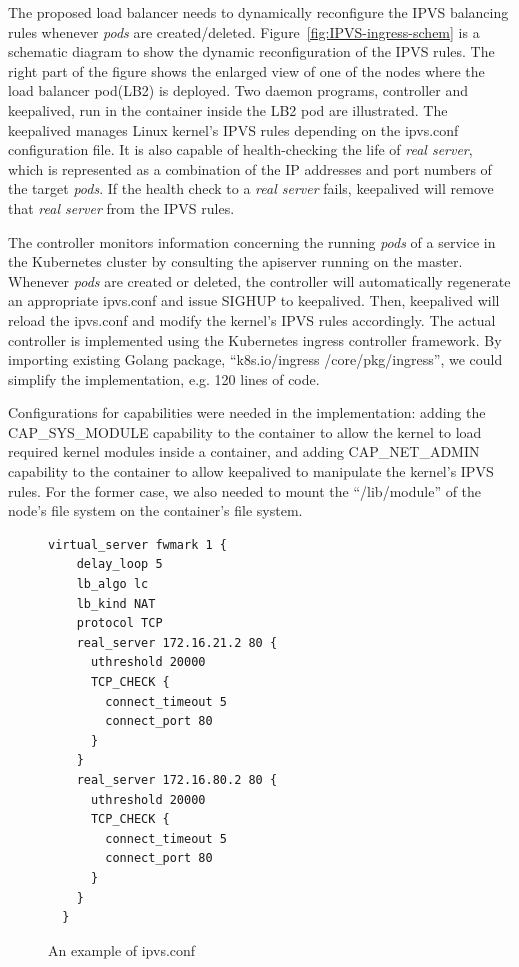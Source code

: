 The proposed load balancer needs to dynamically reconfigure the IPVS balancing rules whenever {\em pods} are created/deleted. 
Figure~\ref{fig:IPVS-ingress-schem} is a schematic diagram to show the dynamic reconfiguration of the IPVS rules.
The right part of the figure shows the enlarged view of one of the nodes where the load balancer pod(LB2) is deployed.
Two daemon programs, controller and keepalived, run in the container inside the LB2 pod are illustrated.
The keepalived manages Linux kernel's IPVS rules depending on the ipvs.conf configuration file.
It is also capable of health-checking the life of {\em real server}, 
which is represented as a combination of the IP addresses and port numbers of the target {\em pods}. 
If the health check to a {\em real server} fails, keepalived will remove that {\em real server} from the IPVS rules.

The controller monitors information concerning the running {\em pods} of a service 
in the Kubernetes cluster by consulting the apiserver running on the master.
Whenever {\em pods} are created or deleted, the controller will automatically regenerate an appropriate ipvs.conf 
and issue SIGHUP to keepalived.
Then, keepalived will reload the ipvs.conf and modify the kernel's IPVS rules accordingly.
The actual controller\cite{ktaka_ccmp_2017_826894} is implemented using the Kubernetes ingress controller\cite{K8sIngress2017} framework. 
By importing existing Golang package, \enquote{k8s.io/ingress /core/pkg/ingress}, we could simplify the implementation, e.g. 
120 lines of code.  


Configurations for capabilities were needed in the implementation: adding the CAP\_SYS\_MODULE capability 
to the container to allow the kernel to load required kernel modules inside a container, 
and adding CAP\_NET\_ADMIN capability to the container to allow keepalived to manipulate the kernel's IPVS rules. 
For the former case, we also needed to mount the \enquote{/lib/module} of the node's file system on the container's file system.

\begin{figure}
  \centering
\begin{minipage}{0.7\columnwidth}
\begin{lstlisting}[frame=single]
  virtual_server fwmark 1 {
    delay_loop 5
    lb_algo lc
    lb_kind NAT
    protocol TCP
    real_server 172.16.21.2 80 {
      uthreshold 20000
      TCP_CHECK {
        connect_timeout 5
        connect_port 80
      }
    }
    real_server 172.16.80.2 80 {
      uthreshold 20000
      TCP_CHECK {
        connect_timeout 5
        connect_port 80
      }
    }
  }
\end{lstlisting}
\end{minipage}
\caption{An example of ipvs.conf}
\label{fig:ipvs.conf}
\end{figure}

